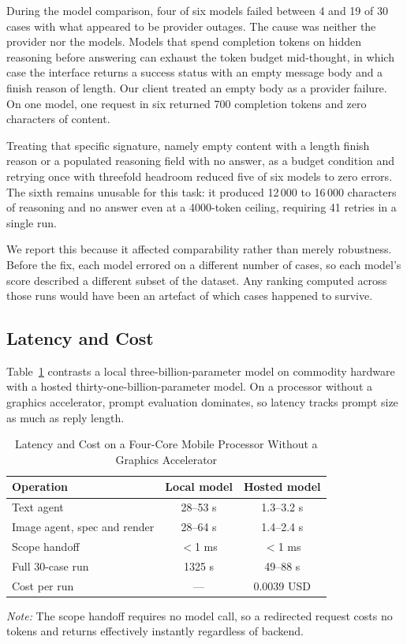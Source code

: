 \documentclass[9pt,twocolumn]{extarticle}
\newcommand{\tabref}[1]{Table~\ref{#1}}
\newcommand{\tabnote}[1]{\par\vspace{2pt}\footnotesize\textit{Note:} #1}
\begin{document}
During the model comparison, four of six models failed between 4 and 19 of 30
cases with what appeared to be provider outages. The cause was neither the
provider nor the models. Models that spend completion tokens on hidden
reasoning before answering can exhaust the token budget mid-thought, in which
case the interface returns a success status with an empty message body and a
finish reason of length. Our client treated an empty body as a provider
failure. On one model, one request in six returned 700 completion tokens and
zero characters of content.

Treating that specific signature, namely empty content with a length finish
reason or a populated reasoning field with no answer, as a budget condition and
retrying once with threefold headroom reduced five of six models to zero
errors. The sixth remains unusable for this task: it produced 12\,000 to
16\,000 characters of reasoning and no answer even at a 4000-token ceiling,
requiring 41 retries in a single run.

We report this because it affected comparability rather than merely robustness.
Before the fix, each model errored on a different number of cases, so each
model's score described a different subset of the dataset. Any ranking computed
across those runs would have been an artefact of which cases happened to
survive.

\subsection{Latency and Cost}
\tabref{tab:perf} contrasts a local three-billion-parameter model on commodity
hardware with a hosted thirty-one-billion-parameter model. On a processor
without a graphics accelerator, prompt evaluation dominates, so latency tracks
prompt size as much as reply length.

\begin{table}[t]
\centering
\caption{Latency and Cost on a Four-Core Mobile Processor Without a Graphics
Accelerator}
\label{tab:perf}
\small
\begin{tabular}{@{}lcc@{}}
\toprule
Operation & Local model & Hosted model\\
\midrule
Text agent                     & 28--53 s & 1.3--3.2 s\\
Image agent, spec and render   & 28--64 s & 1.4--2.4 s\\
Scope handoff                  & $<$1 ms & $<$1 ms\\
Full 30-case run               & 1325 s & 49--88 s\\
Cost per run                   & ---     & 0.0039 USD\\
\bottomrule
\end{tabular}
\tabnote{The scope handoff requires no model call, so a redirected request
costs no tokens and returns effectively instantly regardless of backend.}
\end{table}
\end{document}
